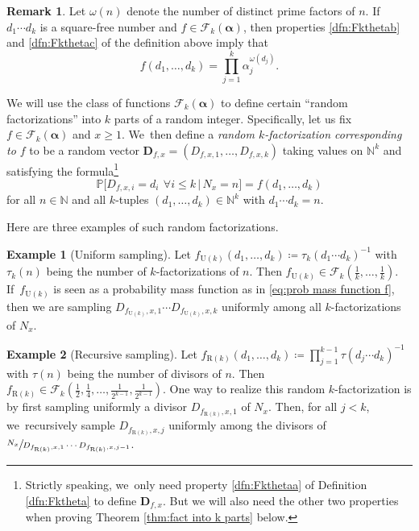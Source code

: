 \documentclass[JEP,XML,SOM,Unicode,published]{cedram}
\newcommand{\bD}{{\boldsymbol D}}
\newcommand{\NN}{\mathbb{N}}
\newcommand{\PP}{\mathbb{P}}
\newcommand{\boldalpha}{\boldsymbol{\alpha}}
\newcommand{\bgg}{\Big}
\theoremstyle{plain}
\theoremstyle{definition}
\newtheorem{example}{Example}
\newtheorem*{rems}{Remark}
\begin{document}
\begin{rems}
Let $\omega(n)$ denote the number of distinct prime factors of $n$. If~$d_1\cdots d_k$ is a square-free number and $f\in\mathcal{F}_k (\boldalpha)$, then properties \eqref{dfn:Fkthetab} and \eqref{dfn:Fkthetac} of the definition above imply that
\begin{equation}
\label{eq:f on squarefrees}
f(d_1,\dots,d_k) = \prod_{j=1}^k \alpha_j^{\omega(d_j)}.
\end{equation}
\end{rems}

We will use the class of functions $\mathcal{F}_k(\boldalpha)$ to define certain ``random factorizations'' into $k$ parts of a random integer. Specifically, let us fix $f\in\mathcal{F}_k(\boldalpha)$ and $x\ge1$. We~then define a {\it random $k$-factorization corresponding to $f$} to be a random vector $\bD_{f, x}=(D_{f,x,1},\dots,D_{f,x,k})$ taking values on $\NN^k$ and satisfying the formula\footnote{Strictly speaking, we~only need property \eqref{dfn:Fkthetaa} of Definition \ref{dfn:Fktheta} to define $\bD_{f,x}$. But we will also need the other two properties when proving Theorem \ref{thm:fact into k parts} below.}
\begin{equation}
\label{eq:prob mass function f}
\PP\bgg[D_{f,x,i} = d_i \ \, \forall i \le k\, \bgg|\, N_x = n\bgg] = f(d_1, \ldots, d_k)
\end{equation}
for all $n\in\NN$ and all $k$-tuples $(d_1,\dots,d_k)\in\NN^k$ with $d_1\cdots d_k=n$.

Here are three examples of such random factorizations.

\begin{example}[Uniform sampling]
\label{ex:uniform sampling}
Let $f_{\mathrm U(k)}(d_1, \ldots, d_k) \coloneqq \tau_k(d_1\cdots d_k)^{-1}$ with $\tau_k(n)$ being the number of $k$-factorizations of $n$. Then $f_{\mathrm U(k)} \in \mathcal F_k(\frac{1}{k}, \ldots, \frac{1}{k})$. If~$f_{\mathrm U(k)}$ is seen as a probability mass function as in \eqref{eq:prob mass function f}, then we are sampling $D_{f_{\mathrm U(k)}, x, 1}\cdots D_{f_{\mathrm U(k)}, x, k}$ uniformly among all $k$-factorizations of $N_x$.
\end{example}

\begin{example}[Recursive sampling]
\label{ex:recursive sampling}
Let $f_{\mathrm R(k)}(d_1, \ldots, d_k) \coloneqq \prod_{j=1}^{k-1} \tau(d_j \cdots d_k)^{-1}$ with $\tau(n)$ being the number of divisors of $n$. Then $f_{\mathrm R(k)} \in \mathcal F_k(\frac{1}{2}, \frac{1}{4}, \ldots, \frac{1}{2^{k-1}}, \frac{1}{2^{k-1}})$. One way to realize this random $k$-factorization is by first sampling uniformly a divisor $D_{f_{\mathrm R(k)}, x, 1}$ of $N_x$. Then, for all $j < k$, we~recursively sample $D_{f_{\mathrm R(k)}, x, j}$ uniformly among the divisors of $\sfrac{N_x}{D_{f_{\mathrm R(k)}, x, 1} \cdots D_{f_{\mathrm R(k)}, x, j-1}}$.
\end{example}
\end{document}
